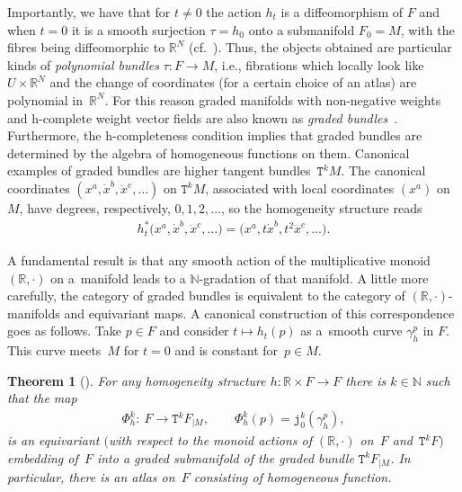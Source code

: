 \documentclass[pdftex]{sigma}
\def\sT{{\mathtt T}}
\numberwithin{equation}{section}
\newtheorem{Theorem}{Theorem}[section]
\begin{document}
Importantly, we have  that for $t \neq 0$ the action $h_{t}$ is a dif\/feomorphism of $F$ and when $t=0$ it is a smooth surjection $\tau=h_0$ onto a submanifold $F_{0}=M$, with the f\/ibres being dif\/feomorphic to $\mathbb{R}^{N}$ (cf.~\cite{Grabowski2012}).  Thus, the objects obtained are particular kinds of \emph{polynomial bundles} $\tau\colon F\to M$, i.e., f\/ibrations which locally look like $U\times{\mathbb R}^N$ and the change of coordinates (for a certain choice of an atlas) are polynomial in~${\mathbb R}^N$. For this reason graded manifolds with non-negative weights and h-complete weight vector f\/ields are also known as \emph{graded bundles}~\cite{Grabowski2012}. Furthermore, the h-completeness condition  implies that  graded bundles are determined by the algebra of homogeneous functions on them.  Canonical examples of  graded bundles are higher tangent bundles~$\sT^kM$.
The canonical coordinates $(x^a,\dot x^b,\ddot x^c,\dots)$ on $\sT^kM$, associated with local coordinates $(x^a)$ on~$M$, have degrees, respectively, $0,1,2,\dots$, so the homogeneity structure reads
\begin{gather*}
h^{*}_t\big(x^a,\dot x^b,\ddot x^c,\dots\big)=\big(x^a,t\dot x^b,t^2\ddot x^c,\dots\big) .
\end{gather*}

A fundamental result is that any smooth action of the multiplicative monoid  $({\mathbb R},\cdot)$ on a~mani\-fold leads to a $\mathbb{N}$-gradation of that manifold. A little more carefully, the category of graded bundles is  equivalent to the category of $(\mathbb{R}, \cdot)$-manifolds and equivariant maps. A canonical construction of this correspondence goes as follows.
Take $ p \in F$ and consider $t \mapsto h_{t}(p)$ as a~smooth curve $\gamma_h^p$ in $F$. This curve meets~$M$ for $t=0$ and is constant for~$p\in M$.

\begin{Theorem}[\cite{Grabowski2012}]
For any homogeneity structure $h\colon {\mathbb R}\times F\to F$ there is $k\in\mathbb{N}$ such that
the map
\begin{gather}
\label{Phi}
\Phi_h^k\colon \ F\to \sT^k F_{|M} ,\qquad \Phi^k_h(p)={\mathtt j}^k_0(\gamma_h^p) ,
\end{gather}
is an equivariant $($with respect to the monoid actions of $({\mathbb R},\cdot)$ on~$F$ and~$\sT^k F)$ embedding of~$F$ into a graded submanifold of the graded bundle $\sT^k F_{|M}$. In particular, there is an atlas on~$F$ consisting of homogeneous function.
\end{Theorem}
\end{document}

